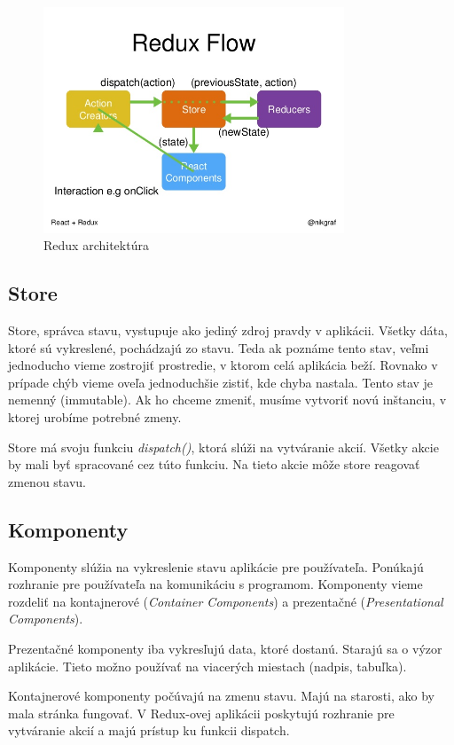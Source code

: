 \begin{figure}
  \centering
    \includegraphics[width=0.8\textwidth]{./images/redux.jpg}
  \caption{Redux architektúra \cite{ReduxObr}}\label{obr:redux}
\end{figure}

\subsection{Store}
Store, správca stavu, vystupuje ako jediný zdroj pravdy v aplikácii. Všetky dáta, ktoré sú vykreslené, pochádzajú zo stavu. Teda ak poznáme tento stav, veľmi jednoducho vieme zostrojiť prostredie, v ktorom celá aplikácia beží. Rovnako v prípade chýb vieme oveľa jednoduchšie zistiť, kde chyba nastala. Tento stav je nemenný (immutable). Ak ho chceme zmeniť, musíme vytvoriť novú inštanciu, v ktorej urobíme potrebné zmeny.

Store má svoju funkciu \emph{dispatch()}, ktorá slúži na vytváranie akcií. Všetky akcie by mali byť spracované cez túto funkciu. Na tieto akcie môže store reagovať zmenou stavu.

\subsection{Komponenty}
Komponenty slúžia na vykreslenie stavu aplikácie pre používateľa. Ponúkajú rozhranie pre používateľa na komunikáciu s programom. Komponenty vieme rozdeliť na kontajnerové (\emph{Container Components}) a prezentačné (\emph{Presentational Components}).

Prezentačné komponenty iba vykresľujú data, ktoré dostanú. Starajú sa o výzor aplikácie. Tieto možno používať na viacerých miestach (nadpis, tabuľka). 

Kontajnerové komponenty počúvajú na zmenu stavu. Majú na starosti, ako by mala stránka fungovať. V Redux-ovej aplikácii poskytujú rozhranie pre vytváranie akcií a majú prístup ku funkcii dispatch.

